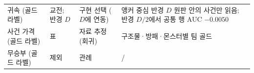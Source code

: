 \begin{longtable}{@{}>{\raggedright\arraybackslash}p{3.0cm}>{\raggedright\arraybackslash}p{2.6cm}>{\raggedright\arraybackslash}p{1.7cm}>{\raggedright\arraybackslash}p{7.2cm}@{}}
  귀속 (골드 라벨) & 교전; 반경 $D$ & 구현 선택 ($D$에 연동) & 앵커 중심 반경 $D$ 원판 안의 사건만 읽음; 반경 $D/2$에서 공통 행 AUC $-0.0050$ \\
  사건 가격 (골드 라벨) & 표 & 자료 추정 (회귀) & 구조물·방패·몬스터별 팀 골드 \\
  무승부 (골드 라벨) & 제외 & 관례 & \numDrawsDropped{} / \numEngDetected{} \\
\end{longtable}
